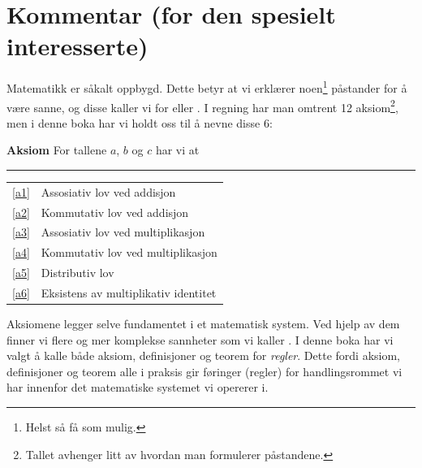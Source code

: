 




	
\section*{Kommentar (for den spesielt interesserte) \label{Kommentar1}}
Matematikk er såkalt  oppbygd. Dette betyr at vi erklærer noen\footnote{Helst så få som mulig.} påstander for å være sanne, og disse kaller vi for  eller . I regning har man omtrent 12 aksiom\footnote{Tallet avhenger litt av hvordan man formulerer påstandene.}, men i denne boka har vi holdt oss til å nevne disse 6:
\regv 

\begin{tcolorbox}[boxrule=0.3 mm,arc=0mm,colback=blue!5] {\large \textbf{Aksiom} \vspace{5 pt}}\newline
For tallene $ a $, $ b $ og $ c $ har vi at
\rule{1\linewidth}{0.75bp}
\begin{center}
	\begin{tabular}{rl}
		\eqref{a1} &Assosiativ lov ved addisjon\\
		\eqref{a2} & Kommutativ lov ved addisjon \\	
		\eqref{a3} & Assosiativ lov ved multiplikasjon \\
		\eqref{a4} & Kommutativ lov ved multiplikasjon \\		
		\eqref{a5} & Distributiv lov\\	
		\eqref{a6} & Eksistens av multiplikativ identitet
	\end{tabular}
\end{center}
\end{tcolorbox}
\vsk
Aksiomene legger selve fundamentet i et matematisk system. Ved hjelp av dem finner vi flere og mer komplekse sannheter som vi kaller . I denne boka har vi valgt å kalle både aksiom, definisjoner og teorem for \textsl{regler}. Dette fordi aksiom, definisjoner og teorem alle i praksis gir føringer (regler) for handlingsrommet vi har innenfor det matematiske systemet vi opererer i.\vsk
